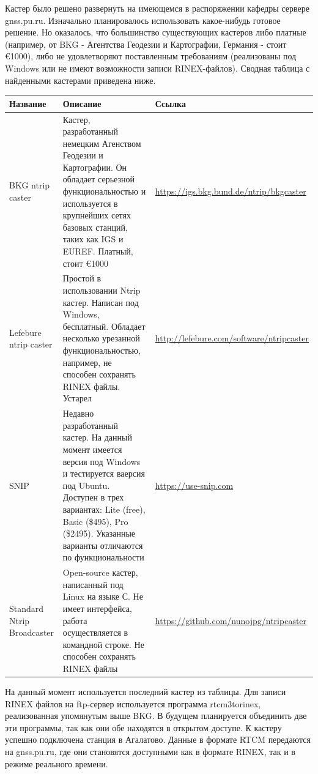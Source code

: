\documentclass[a4paper,12pt]{report}
\begin{document}
Кастер было решено развернуть на имеющемся в распоряжении кафедры сервере gnss.pu.ru. Изначально планировалось использовать какое-нибудь 
готовое решение. Но оказалось, что большинство существующих кастеров либо платные (например, от BKG - Агентства Геодезии и Картографии, Германия - стоит 
\euro1000), либо не удовлетворяют поставленным требованиям (реализованы под Windows или не 
имеют возможности записи RINEX-файлов). Сводная таблица с найденными кастерами приведена ниже.

\begin{center}
{\footnotesize
\begin{tabular}{| p{4cm} | p{8cm} | p{4cm} |}
\hline
\bf{Название} & \bf{Описание} & \bf{Ссылка} \\ \hline
BKG ntrip caster & Кастер, разработанный немецким Агенством Геодезии и Картографии. Он обладает серьезной функциональностью и используется в 
крупнейших сетях базовых станций, таких как IGS и EUREF. Платный, стоит \euro1000 & \url{https://igs.bkg.bund.de/ntrip/bkgcaster} \\ \hline
Lefebure ntrip caster & Простой в использовании Ntrip кастер. Написан под Windows, бесплатный. Обладает несколько урезанной функциональностью, 
например, не способен сохранять RINEX файлы. Устарел & \url{http://lefebure.com/software/ntripcaster} \\ \hline
SNIP & Недавно разработанный кастер. На данный момент имеется версия под Windows и тестируется ваерсия под Ubuntu. Доступен в трех вариантах: 
Lite (free), Basic (\$495), Pro (\$2495). Указанные варианты отличаются по функциональности & \url{https://use-snip.com} \\ \hline
Standard Ntrip Broadcaster & Open-source кастер, написанный под Linux на языке С. Не имеет интерфейса, работа осуществляется в командной строке. 
Не способен сохранять RINEX файлы & \url{https://github.com/nunojpg/ntripcaster} \\ 
\hline
\end{tabular}
}
\end{center}

На данный момент используется последний кастер из таблицы. Для записи RINEX файлов на ftp-сервер 
используется программа rtcm3torinex, реализованная упомянутым выше BKG. В будущем планируется объединить две эти программы, так как они
обе находятся в открытом доступе. К кастеру успешно подключена станция в Агалатово. Данные в формате RTCM передаются на gnss.pu.ru, 
где они становятся доступными как в формате RINEX, так и в режиме реального времени.
\end{document}
